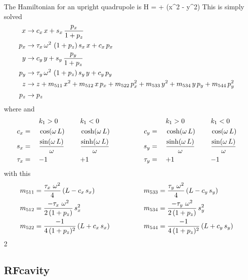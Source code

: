 \documentclass{book}
\begin{document}
The Hamiltonian for an upright quadrupole is
\Begineq
  H =  +  (x^2 - y^2)
\Endeq
This is simply solved
\begin{align}
  x   &\rightarrow c_x \, x + s_x \, \frac{p_x}{1 + p_z} \nonumber \\
  p_x &\rightarrow \tau_x \, \omega^2 \, \, (1 + p_z) \, s_x \, x + c_x \, p_x \nonumber \\
  y   &\rightarrow c_y \, y + s_y \, \frac{p_y}{1 + p_z} \nonumber \\
  p_y &\rightarrow \tau_y \, \omega^2 \, \, (1 + p_z) \, s_y \, y + c_y \, p_y \nonumber \\
  z   &\rightarrow z + m_{511} \, x^2 + m_{512} \, x \, p_x + m_{522} \, p_x^2 + 
                   m_{533} \, y^2 + m_{534} \, y \, p_y + m_{544} \, p_y^2 \nonumber \\
  p_z &\rightarrow p_z \nonumber
\end{align}
where 
\Begineq
  \om \equiv {}
\Endeq
and
\begin{alignat}{6}
         &\hspace*{3ex}  && k_1 > 0          &\hspace*{3ex}& k_1 < 0 & \qquad \qquad
         &\hspace*{3ex}  && k_1 > 0          &\hspace*{3ex}& k_1 < 0 \nonumber \\
     c_x &=   && \cos  (\omega \, L) && \cosh (\omega \, L) & \qquad \qquad
     c_y &=   && \cosh (\omega \, L) && \cos  (\omega \, L) \nonumber \\
     s_x &=   && \frac{\sin  (\omega \, L)}{\omega} && \frac{\sinh (\omega \, L)}{\omega} & \qquad \qquad
     s_y &=   && \frac{\sinh (\omega \, L)}{\omega} && \frac{\sin  (\omega \, L)}{\omega} \\
  \tau_x &=   && {-}1             && {+}1             & \qquad \qquad
  \tau_y &=   && {+}1             && {-}1             \nonumber
\end{alignat}
with this
\begin{alignat}{2}
  m_{511} &= \frac{\tau_x \,\, \omega^2}{4} \, (L - c_x \, s_x) & \qquad \qquad
  m_{533} &= \frac{\tau_y \,\, \omega^2}{4} \, (L - c_y \, s_y) \nonumber \\
  m_{512} &= \frac{-\tau_x \,\, \omega^2}{2 \, (1 + p_z)} \, s_x^2 & \qquad \qquad
  m_{534} &= \frac{-\tau_y \,\, \omega^2}{2 \, (1 + p_z)} \, s_y^2 \nonumber \\
  m_{522} &= \frac{-1}{4 \, (1 + p_z)^2} \, (L + c_x \, s_x) & \qquad \qquad
  m_{544} &= \frac{-1}{4 \, (1 + p_z)^2} \, (L + c_y \, s_y) \nonumber
\end{alignat}{2}


\subsection{RFcavity}

\end{document}
